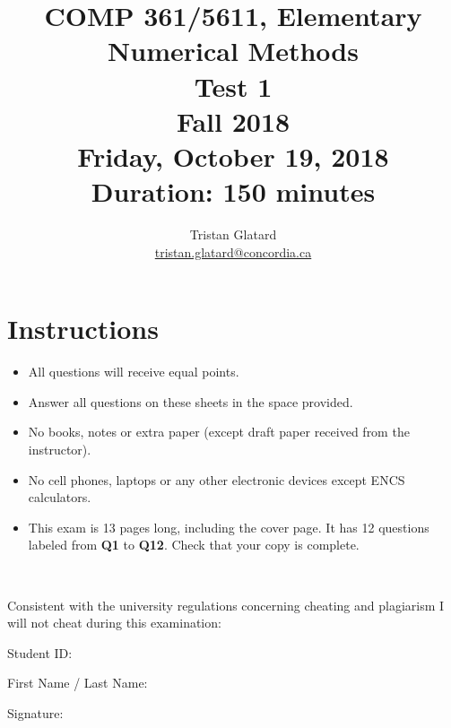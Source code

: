 \documentclass{llncs}
\title{COMP 361/5611, Elementary Numerical Methods \\ Test 1 \\ Fall 2018 \\ Friday, October 19, 2018 \\ Duration: 150 minutes}
\author{Tristan Glatard\\
  \href{mailto:tristan.glatard@concordia.ca}{tristan.glatard@concordia.ca}\\
  \vspace*{0.3cm}
  }
\institute{Concordia University\\
  Department of Computer Science and Software Engineering}
\newcounter{ques}
\newcommand{\myspace}[0]{\vspace*{0.25cm}}
\begin{document}
\maketitle

\section*{Instructions}
\begin{itemize}
\item All questions will receive equal points.
\item Answer all questions on these sheets in the space provided.
\item No books, notes or extra paper (except draft paper received from the instructor).
\item No cell phones, laptops or any other electronic devices except ENCS calculators.
\item This exam is 13 pages long, including the cover page. It has
  12 questions labeled from \textbf{Q1} to \textbf{Q12}. Check that your copy
  is complete.
\end{itemize}

\myspace

\myspace

\hrulefill\\

\myspace

Consistent with the university regulations concerning cheating and plagiarism I will not cheat during this examination:

\myspace

\myspace

Student ID: \dotfill

\myspace

\myspace

First Name / Last Name: \dotfill

\myspace

\myspace

Signature: \dotfill
\end{document}
